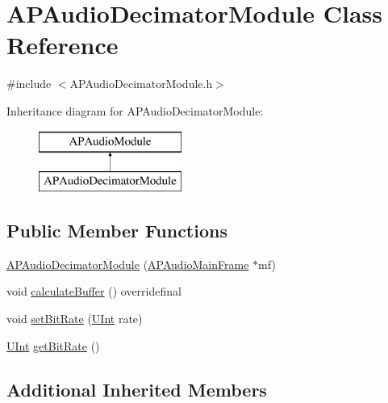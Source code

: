 \hypertarget{class_a_p_audio_decimator_module}{\section{A\+P\+Audio\+Decimator\+Module Class Reference}
\label{class_a_p_audio_decimator_module}
}


{\ttfamily \#include $<$A\+P\+Audio\+Decimator\+Module.\+h$>$}

Inheritance diagram for A\+P\+Audio\+Decimator\+Module\+:\begin{figure}[H]
\begin{center}
\leavevmode
\includegraphics[height=2.000000cm]{class_a_p_audio_decimator_module}
\end{center}
\end{figure}
\subsection*{Public Member Functions}
\begin{DoxyCompactItemize}
\item 
\hyperlink{class_a_p_audio_decimator_module_a6fa88d486504734d4007bc89638f4254}{A\+P\+Audio\+Decimator\+Module} (\hyperlink{class_a_p_audio_main_frame}{A\+P\+Audio\+Main\+Frame} $\ast$mf)
\item 
void \hyperlink{class_a_p_audio_decimator_module_aeb5165253ed1286fd5a545150a016aae}{calculate\+Buffer} () overridefinal
\item 
void \hyperlink{class_a_p_audio_decimator_module_a1c9ff1ab4eceefa8dcee03db0e2fa109}{set\+Bit\+Rate} (\hyperlink{_a_p_audio_module_8h_a9cc0620fb2e91b51587c6936060d4161}{U\+Int} rate)
\item 
\hyperlink{_a_p_audio_module_8h_a9cc0620fb2e91b51587c6936060d4161}{U\+Int} \hyperlink{class_a_p_audio_decimator_module_a34201704335c3ba92524e024a9c6e7ee}{get\+Bit\+Rate} ()
\end{DoxyCompactItemize}
\subsection*{Additional Inherited Members}


